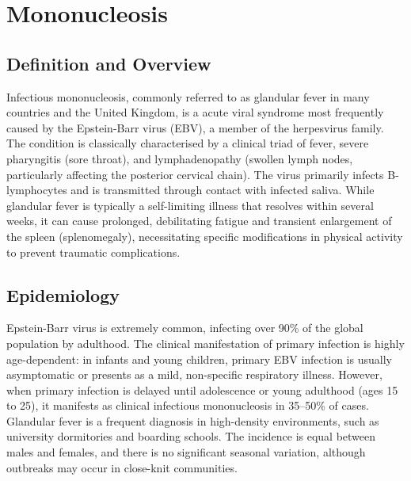 \chapter{Mononucleosis}

\section*{Definition and Overview}
Infectious mononucleosis, commonly referred to as glandular fever in many countries and the United Kingdom, is a acute viral syndrome most frequently caused by the Epstein-Barr virus (EBV), a member of the herpesvirus family. The condition is classically characterised by a clinical triad of fever, severe pharyngitis (sore throat), and lymphadenopathy (swollen lymph nodes, particularly affecting the posterior cervical chain). The virus primarily infects B-lymphocytes and is transmitted through contact with infected saliva. While glandular fever is typically a self-limiting illness that resolves within several weeks, it can cause prolonged, debilitating fatigue and transient enlargement of the spleen (splenomegaly), necessitating specific modifications in physical activity to prevent traumatic complications.

\section*{Epidemiology}
Epstein-Barr virus is extremely common, infecting over 90\% of the global population by adulthood. The clinical manifestation of primary infection is highly age-dependent: in infants and young children, primary EBV infection is usually asymptomatic or presents as a mild, non-specific respiratory illness. However, when primary infection is delayed until adolescence or young adulthood (ages 15 to 25), it manifests as clinical infectious mononucleosis in 35--50\% of cases. Glandular fever is a frequent diagnosis in high-density environments, such as university dormitories and boarding schools. The incidence is equal between males and females, and there is no significant seasonal variation, although outbreaks may occur in close-knit communities.

